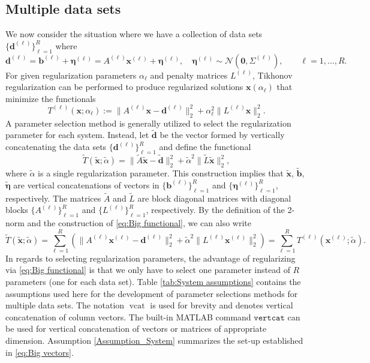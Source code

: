 \documentclass[12pt]{article}
\newcommand{\bVec}{\mathbf{b}}	%
\newcommand{\dVec}{\mathbf{d}}	%
\newcommand{\xVec}{\mathbf{x}}	%
\DeclareMathOperator{\vcat}{vcat}	%
\newcommand{\regparam}{\alpha}
\newcommand{\noise}{\eta}	%
\newcommand{\noiseVec}{\bm{\noise}}	%
\begin{document}
\subsection{Multiple data sets}
We now consider the situation where we have a collection of data sets $\{\dVec^{(\ell)}\}_{\ell=1}^R$ where 
\begin{equation}
\label{eq:Big vectors}
\dVec^{(\ell)} = \bVec^{(\ell)} + \noiseVec^{(\ell)} = {A^{(\ell)}}\xVec^{(\ell)} + \noiseVec^{(\ell)}, \quad \noiseVec^{(\ell)} \sim \mathcal{N}(\bm{0},\Sigma^{(\ell)}), \qquad \ell = 1,\ldots,R.
\end{equation}
For given regularization parameters $\regparam_\ell$ and penalty matrices $L^{(\ell)}$, Tikhonov regularization can be performed to produce regularized solutions $\xVec(\regparam_\ell)$ that minimize the functionals
\begin{equation}
T^{(\ell)}(\xVec;\regparam_\ell) := \|A^{(\ell)}\xVec - \dVec^{(\ell)}\|_2^2 + \regparam_\ell^2\|L^{(\ell)}\xVec\|_2^2.
\end{equation}
A parameter selection method is generally utilized to select the regularization parameter for each system. Instead, let $\widetilde{\dVec}$ be the vector formed by vertically concatenating the data sets $\{\dVec^{(\ell)}\}_{\ell=1}^R$ and define the functional
\begin{equation}
\label{eq:Big functional}
\widetilde{T}\left(\widetilde{\xVec};\widetilde{\regparam}\right) = \|\widetilde{A}\widetilde{\xVec} - \widetilde{\dVec}\|_2^2 + \widetilde{\regparam}^2\|\widetilde{L}\widetilde{\xVec}\|_2^2,
\end{equation}
where $\widetilde{\regparam}$ is a single regularization parameter. This construction implies that $\widetilde{\xVec}$, $\widetilde{\bVec}$, $\widetilde{\noiseVec}$ are vertical concatenations of vectors in $\{\bVec^{(\ell)}\}_{\ell=1}^R$ and $\{\noiseVec^{(\ell)}\}_{\ell=1}^R$, respectively. The matrices $\widetilde{A}$ and $\widetilde{L}$ are block diagonal matrices with diagonal blocks $\{A^{(\ell)}\}_{\ell=1}^R$ and $\{L^{(\ell)}\}_{\ell=1}^R$, respectively. By the definition of the 2-norm and the construction of \eqref{eq:Big functional}, we can also write
\begin{equation}
\label{eq:Big functional 2}
\widetilde{T}\left(\widetilde{\xVec};\widetilde{\regparam}\right) = \sum_{\ell = 1}^R \left(\|A^{(\ell)}\xVec^{(\ell)} - \dVec^{(\ell)}\|_2^2 + \widetilde{\regparam}^2\|L^{(\ell)} \xVec^{(\ell)}\|_2^2\right) = \sum_{\ell=1}^R T^{(\ell)}\left(\xVec^{(\ell)};\widetilde{\regparam}\right).
\end{equation}
In regards to selecting regularization parameters, the advantage of regularizing via \eqref{eq:Big functional} is that we only have to select one parameter instead of $R$ parameters (one for each data set). Table \ref{tab:System assumptions} contains the assumptions used here for the development of parameter selections methods for multiple data sets. The notation $\vcat$ is used for brevity and denotes vertical concatenation of column vectors. The built-in MATLAB command $\mathtt{vertcat}$ can be used for vertical concatenation of vectors or matrices of appropriate dimension. Assumption \ref{Assumption_System} summarizes the set-up established in \eqref{eq:Big vectors}.
\end{document}
